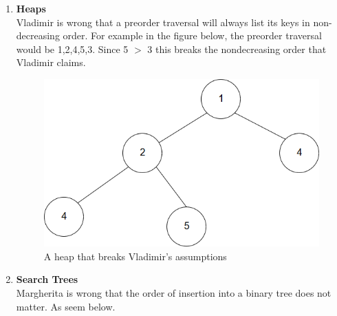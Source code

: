 \documentclass{article}
\begin{document}
\begin{enumerate}
 \item \textbf{Heaps}
 \\
 Vladimir is wrong that a preorder traversal will always list its keys in non-decreasing order. For example in the figure below, the preorder traversal would be 1,2,4,5,3. Since 5 $>$ 3 this breaks the nondecreasing order that Vladimir claims.
 
  \begin{figure}[H]
 	\centering
 	\caption{A heap that breaks Vladimir's assumptions}
 	\label{Heaps}
	\includegraphics[width=\textwidth]{Heap}
 \end{figure}
 

 \item \textbf{Search Trees}
 \\
 Margherita is wrong that the order of insertion into a binary tree does not matter. As seem below.


\end{enumerate}
\end{document}
